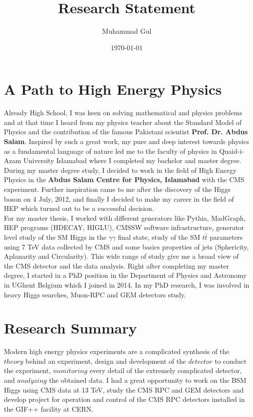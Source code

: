 \documentclass[12pt]{article}
\title{\textbf{Research Statement}}
\author{Muhammad Gul}
\date{\small \today}
\begin{document}
\maketitle
\section*{A Path to High Energy Physics}
Already High School, I was keen on solving mathematical and physics problems and at that time I heard from my physics teacher about the Standard Model of Physics and the contribution of the famous Pakistani scientist \textbf{Prof. Dr. Abdus Salam}. Inspired by such a great work, my pure and deep interest towards physics as a fundamental language of nature led me to the faculty of physics in Quaid-i-Azam University Islamabad where I completed my bachelor and master degree. During my master degree study, I decided to work in the field of High Energy Physics in the \textbf{Abdus Salam Centre for Physics, Islamabad} with the CMS experiment. Further inspiration came to me after the discovery of the Higgs boson on 4 July, 2012, and finally I decided to make my career in the field of HEP which turned out to be a successful decision.\\
For my master thesis, I worked with different generators like Pythia, MadGraph, HEP programs (HDECAY, HIGLU), CMSSW software infrastructure, generator level study of the SM Higgs in the $\gamma\gamma$ final state, study of the SM $t\bar t$ parameters using 7 TeV data collected by CMS and some basics properties of jets (Sphericity, Aplanarity and Circularity). This wide range of study give me a broad view of the CMS detector and the data analysis. Right after completing my master degree, I started in a PhD position in the Department of Physics and Astronomy in UGhent Belgium which I joined in 2014. In my PhD research, I was involved in heavy Higgs searches, Muon-RPC and GEM detectors study.
\section*{Research Summary}
Modern high energy physics experiments are a complicated synthesis of the $theory$ behind an experiment, design and development of the $detector$ to conduct the experiment, $monitoring$ every detail of the extremely complicated detector, and $analyzing$ the obtained data. I had a great opportunity to work on the BSM Higgs using CMS data at 13 TeV, study the CMS RPC and GEM detectors and develop project for operation and control of the CMS RPC detectors installed in the GIF++ facility at CERN.
  
\end{document}
